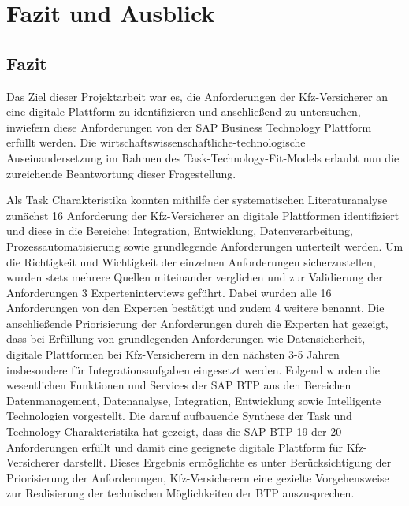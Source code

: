 \chapter{Fazit und Ausblick}

\section{Fazit}
Das Ziel dieser Projektarbeit war es, die Anforderungen der Kfz-Versicherer an eine digitale Plattform zu identifizieren und anschließend zu untersuchen, inwiefern diese Anforderungen von der SAP Business Technology Plattform erfüllt werden. Die wirtschaftswissenschaftliche-technologische Auseinandersetzung im Rahmen des Task-Technology-Fit-Models erlaubt nun die zureichende Beantwortung dieser Fragestellung. 

Als Task Charakteristika konnten mithilfe der systematischen Literaturanalyse zunächst 16 Anforderung der Kfz-Versicherer an digitale Plattformen identifiziert und diese in die Bereiche: Integration, Entwicklung, Datenverarbeitung, Prozessautomatisierung sowie grundlegende Anforderungen unterteilt werden. Um die Richtigkeit und Wichtigkeit der einzelnen Anforderungen sicherzustellen, wurden stets mehrere Quellen miteinander verglichen und zur Validierung der Anforderungen 3 Experteninterviews geführt. Dabei wurden alle 16 Anforderungen von den Experten bestätigt und zudem 4 weitere benannt. Die anschließende Priorisierung der Anforderungen durch die Experten hat gezeigt, dass bei Erfüllung von grundlegenden Anforderungen wie Datensicherheit, digitale Plattformen bei Kfz-Versicherern in den nächsten 3-5 Jahren insbesondere für Integrationsaufgaben eingesetzt werden. Folgend wurden die wesentlichen Funktionen und Services der SAP BTP aus den Bereichen Datenmanagement, Datenanalyse, Integration, Entwicklung sowie Intelligente Technologien vorgestellt. Die darauf aufbauende Synthese der Task und Technology Charakteristika hat gezeigt, dass die SAP BTP 19 der 20 Anforderungen erfüllt und damit eine geeignete digitale Plattform für Kfz-Versicherer darstellt. Dieses Ergebnis ermöglichte es unter Berücksichtigung der Priorisierung der Anforderungen, Kfz-Versicherern eine gezielte Vorgehensweise zur Realisierung der technischen Möglichkeiten der BTP auszusprechen.

